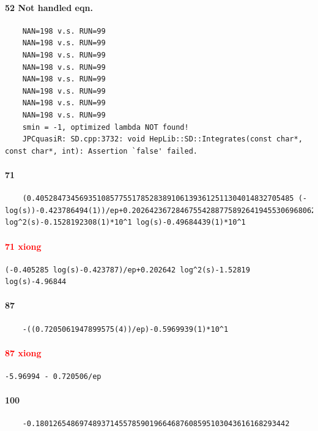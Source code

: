 \documentclass{article}
\newcommand{\WN}[1]{\textcolor{RawSienna}{#1}}
\newcommand{\WNNH}{\WN{Not handled eqn. }}
\begin{document}
\paragraph{52	\WNNH}
\begin{verbatim}
	NAN=198 v.s. RUN=99
	NAN=198 v.s. RUN=99
	NAN=198 v.s. RUN=99
	NAN=198 v.s. RUN=99
	NAN=198 v.s. RUN=99
	NAN=198 v.s. RUN=99
	NAN=198 v.s. RUN=99
	NAN=198 v.s. RUN=99
	smin = -1, optimized lambda NOT found!
	JPCquasiR: SD.cpp:3732: void HepLib::SD::Integrates(const char*, const char*, int): Assertion `false' failed.
\end{verbatim}
\paragraph{71}
\begin{verbatim}
	(0.40528473456935108577551785283891061393612511304014832705485 (-log(s))-0.423786494(1))/ep+0.20264236728467554288775892641945530696806255652007416352742 log^2(s)-0.1528192308(1)*10^1 log(s)-0.49684439(1)*10^1
\end{verbatim}
\paragraph{\textcolor{red}{71 xiong}}
\begin{verbatim}
(-0.405285 log(s)-0.423787)/ep+0.202642 log^2(s)-1.52819 log(s)-4.96844
\end{verbatim}
\paragraph{87}
\begin{verbatim}
	-((0.7205061947899575(4))/ep)-0.5969939(1)*10^1
\end{verbatim}
\paragraph{\textcolor{red}{87 xiong}}
\begin{verbatim}
-5.96994 - 0.720506/ep
\end{verbatim}
\paragraph{100}
\begin{verbatim}
	-0.1801265486974893714557859019664687608595103043616168293442
\end{verbatim}
\end{document}
